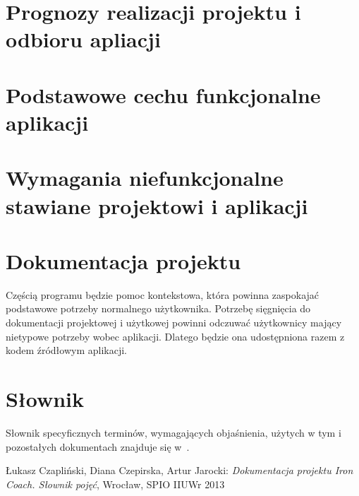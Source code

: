 \section{Prognozy realizacji projektu i odbioru apliacji}
\section{Podstawowe cechu funkcjonalne aplikacji}
\section{Wymagania niefunkcjonalne stawiane projektowi i aplikacji}
\section{Dokumentacja projektu}
Częścią programu będzie pomoc kontekstowa, która powinna zaspokajać podstawowe potrzeby normalnego użytkownika. Potrzebę sięgnięcia do dokumentacji projektowej i użytkowej powinni odczuwać użytkownicy mający nietypowe potrzeby wobec aplikacji. Dlatego będzie ona udostępniona razem z kodem źródłowym aplikacji.
\section{Słownik}
Słownik specyficznych terminów, wymagających objaśnienia, użytych w tym i pozostałych dokumentach znajduje się w~\cite{Sł}.
\begin{thebibliography}{99}
   Łukasz Czapliński, Diana Czepirska, Artur Jarocki: {\it Dokumentacja projektu Iron Coach. Słownik pojęć}, Wrocław, SPIO IIUWr 2013
\end{thebibliography}

